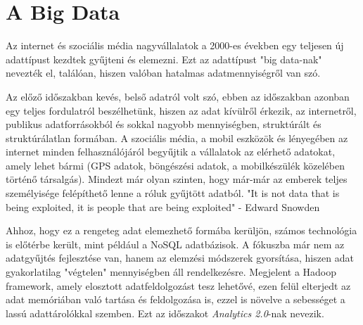 \section{A Big Data}

Az internet és szociális média nagyvállalatok a 2000-es években egy teljesen új adattípust kezdtek gyűjteni és elemezni. Ezt az adattípust "big data-nak" nevezték el, találóan, hiszen valóban hatalmas adatmennyiségről van szó.

Az előző időszakban kevés, belső adatról volt szó, ebben az időszakban azonban egy teljes fordulatról beszélhetünk, hiszen az adat kívülről érkezik, az internetről, publikus adatforrásokból és sokkal nagyobb mennyiségben, struktúrált és struktúrálatlan formában. A szociális média, a mobil eszközök és lényegében az internet minden felhasználójáról begyűjtik a vállalatok az elérhető adatokat, amely lehet bármi (GPS adatok, böngészési adatok, a mobilkészülék közelében történő társalgás). Mindezt már olyan szinten, hogy már-már az emberek teljes személyisége felépíthető lenne a róluk gyűjtött adatból. "It is not data that is being exploited, it is people that are being exploited" - Edward Snowden

Ahhoz, hogy ez a rengeteg adat elemezhető formába kerüljön, számos technológia is előtérbe került, mint például a NoSQL adatbázisok. A fókuszba már nem az adatgyűjtés fejlesztése van, hanem az elemzési módszerek gyorsítása, hiszen adat gyakorlatilag "végtelen" mennyiségben áll rendelkezésre. Megjelent a Hadoop framework, amely elosztott adatfeldolgozást tesz lehetővé, ezen felül elterjedt az adat memóriában való tartása és feldolgozása is, ezzel is növelve a sebességet a lassú adattárolókkal szemben. Ezt az időszakot \textit{Analytics 2.0}-nak nevezik.

